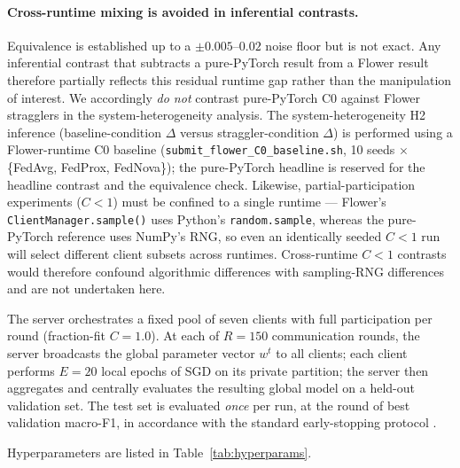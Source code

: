 \documentclass[11pt,a4paper]{article}
\begin{document}
\paragraph{Cross-runtime mixing is avoided in inferential contrasts.}
Equivalence is established up to a $\pm 0.005$--$0.02$ noise floor but
is not exact. Any inferential contrast that subtracts a pure-PyTorch
result from a Flower result therefore partially reflects this residual
runtime gap rather than the manipulation of interest. We accordingly
\emph{do not} contrast pure-PyTorch C0 against Flower stragglers in the
system-heterogeneity analysis. The system-heterogeneity H2 inference
(baseline-condition $\Delta$ versus straggler-condition $\Delta$) is
performed using a Flower-runtime C0 baseline (\texttt{submit\_flower\_C0\_baseline.sh},
10 seeds $\times$ \{FedAvg, FedProx, FedNova\}); the pure-PyTorch headline
is reserved for the headline contrast and the equivalence check.
Likewise, partial-participation experiments ($C < 1$) must be confined
to a single runtime — Flower's \texttt{ClientManager.sample()} uses
Python's \texttt{random.sample}, whereas the pure-PyTorch reference uses
NumPy's RNG, so even an identically seeded $C < 1$ run will select
different client subsets across runtimes. Cross-runtime $C < 1$
contrasts would therefore confound algorithmic differences with
sampling-RNG differences and are not undertaken here.

The server orchestrates a fixed pool of seven clients with full
participation per round (fraction-fit $C = 1.0$). At each of $R = 150$
communication rounds, the server broadcasts the global parameter vector
$w^t$ to all clients; each client performs $E = 20$ local epochs of SGD
on its private partition; the server then aggregates and centrally
evaluates the resulting global model on a held-out validation set. The
test set is evaluated \emph{once} per run, at the round of best
validation macro-F1, in accordance with the standard early-stopping
protocol \citep{goodfellow2016deeplearning}.

Hyperparameters are listed in Table~\ref{tab:hyperparams}.
\end{document}
